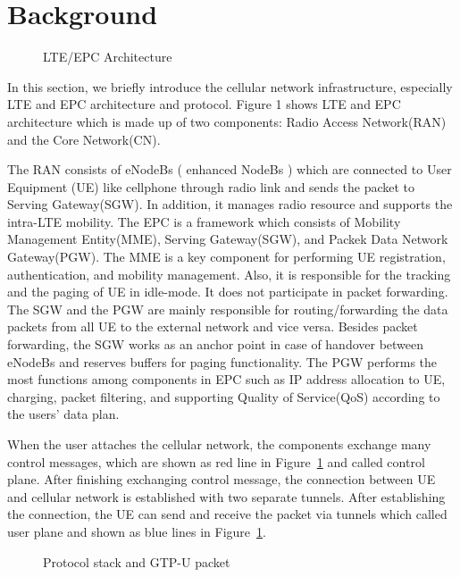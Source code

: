 \section{Background}


\begin{figure}
\centering
{}
\caption{LTE/EPC Architecture}
\label{fig:mobi_basic}
\end{figure}

In this section, we briefly introduce the cellular network infrastructure, especially LTE and EPC architecture and protocol. 
Figure 1 shows LTE and EPC architecture which is made up of two components: Radio Access Network(RAN) and the Core Network(CN). 

 The RAN consists of eNodeBs ( enhanced NodeBs ) which are connected to User Equipment (UE) like cellphone  through radio link and sends the packet to Serving Gateway(SGW).  In addition, it manages radio resource and supports the intra-LTE mobility. The EPC is a framework which consists of Mobility Management Entity(MME), Serving Gateway(SGW), and Packek Data Network Gateway(PGW). The MME is a key component for performing UE registration, authentication, and mobility management. Also, it is responsible for the tracking and the paging of UE in idle-mode. It does not participate in packet forwarding. The SGW and the PGW are mainly responsible for routing/forwarding the data packets from all UE to the external network and vice versa. Besides packet forwarding, the SGW works as an anchor point in case of handover between eNodeBs and reserves buffers for paging functionality. The PGW performs the most functions among components in EPC such as IP address allocation to UE, charging, packet filtering, and supporting Quality of Service(QoS) according to the users’ data plan.

When the user attaches the cellular network, the components exchange many control messages, which are shown as red line in Figure~\ref{fig:mobi_basic} and called control plane.
After finishing exchanging control message, the connection between UE and cellular network is established with two separate tunnels.
After establishing the connection, the UE can send and receive the packet via tunnels which called user plane and shown as blue lines in Figure~\ref{fig:mobi_basic}. 

\begin{figure}
\centering
{}
\caption{Protocol stack and GTP-U packet}
\label{fig:gtp-u}
\end{figure}

